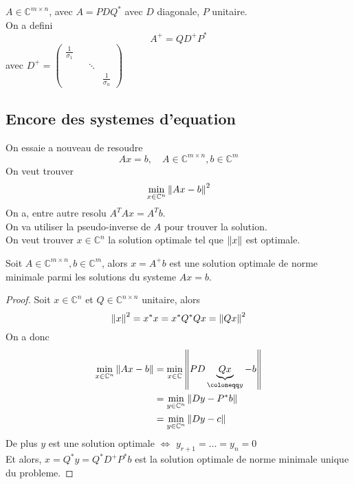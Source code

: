\documentclass[../main.tex]{subfiles}
\begin{document}
$A \in \mathbb{C}^{m\times n}$, avec $A = P D Q^{*}$ avec $D$ diagonale, $P$ unitaire.\\
On a defini 
\[ 
A^{+} = Q D^{+} P^{*}
\]
avec $D^{+}= \begin{pmatrix}
	\frac{1}{\sigma_1} & & \\
			   & &\ddots &\\
			   & & &\frac{1}{\sigma_n}
\end{pmatrix} $
\subsection{Encore des systemes d'equation}
On essaie a nouveau de resoudre
\[ 
A x = b, \quad A \in \mathbb{C}^{m\times n}, b \in \mathbb{C}^{m}
\]
On veut trouver
\[ 
\min_{x \in \mathbb{C}^{n}} \left\lVert A x -b\right\rVert ^{2}
\]
On a, entre autre resolu $A ^{T}A x = A^{T}b$.\\
On va utiliser la pseudo-inverse de $A$ pour trouver la solution.\\ 
On veut trouver $x \in \mathbb{C}^{n}$ la solution optimale tel que $\left\lVert x\right\rVert $ est optimale.\\
\begin{thm}
Soit $A \in \mathbb{C}^{m\times n}, b \in \mathbb{C}^{m}$, alors $x= A^{+}b$	est une solution optimale de norme minimale parmi les solutions du systeme $Ax = b$.
\end{thm}	
\begin{proof}
Soit $x \in \mathbb{C}^{n}$ et $Q \in \mathbb{C}^{n\times n}$ unitaire, alors
\[ 
\left\lVert x\right\rVert ^{2}= x^{*}x = x^{*}Q^{*}Q x = \left\lVert Qx\right\rVert ^{2}
\]
On a donc
\begin{align*}
	\min_{x \in \mathbb{C}^{n}} \N { Ax -b} &= \min _{x \in \mathbb{C}} \N { PD \underbrace{Qx}_{ \coloneqq y} - b} \\
	&= \min_{y \in \mathbb{C}^{n}} \N { Dy - P^{*}b} \\
	&= \min_{y \in \mathbb{C}^{n}} \N { D y -c} 
\end{align*}
De plus $y$ est une solution optimale $\iff$ $y_{r+1} = \ldots = y_n =0$\\
Et alors, $x  = Q^{*}y = Q^{*}D^{+}P^{*}b$ est la solution optimale de norme minimale unique du probleme.

\end{proof}
\end{document}
